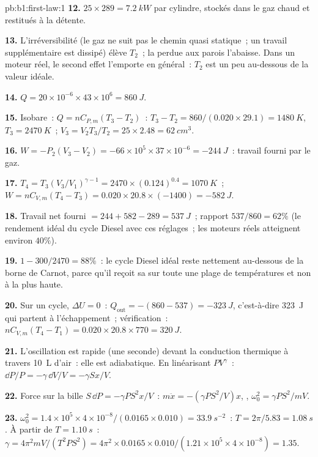 \begin{solution}{pb:b1:first-law:1}
\textbf{12.} $25 \times 289 = \qty{7.2}{kW}$ par cylindre, stockés dans le gaz
chaud et restitués à la détente.

\textbf{13.} L'irréversibilité (le gaz ne suit pas le chemin quasi statique~;
un travail supplémentaire est dissipé) élève $T_2$~; la  perdue aux
parois l'abaisse. Dans un moteur réel, le second effet l'emporte en général~:
$T_2$ est un peu au-dessous de la valeur idéale.

\textbf{14.} $Q = 20\times10^{-6} \times 43\times10^6 = \qty{860}{J}$.

\textbf{15.} Isobare~: $Q = nC_{P,m}(T_3 - T_2)$~: $T_3 - T_2 = 860/(0.020 \times
29.1) = \qty{1480}{K}$, $T_3 = \qty{2470}{K}$~; $V_3 = V_2T_3/T_2 = 25 \times
2.48 = \qty{62}{cm^3}$.

\textbf{16.} $W = -P_2(V_3 - V_2) = -66\times10^5 \times 37\times10^{-6} =
\qty{-244}{J}$~: travail fourni par le gaz.

\textbf{17.} $T_4 = T_3(V_3/V_1)^{\gamma - 1} = 2470 \times (0.124)^{0.4} =
\qty{1070}{K}$~; $W = nC_{V,m}(T_4 - T_3) = 0.020 \times 20.8 \times (-1400) =
\qty{-582}{J}$.

\textbf{18.} Travail net fourni $= 244 + 582 - 289 = \qty{537}{J}$~; rapport
$537/860 = 62\%$ (le rendement idéal du cycle Diesel avec ces réglages~; les
moteurs réels atteignent environ $40\%$).

\textbf{19.} $1 - 300/2470 = 88\%$~: le cycle Diesel idéal reste nettement
au-dessous de la borne de Carnot, parce qu'il reçoit sa  sur toute une
plage de températures et non à la plus haute.

\textbf{20.} Sur un cycle, $\Delta U = 0$~: $Q_{\text{out}} = -(860 - 537) =
\qty{-323}{J}$, c'est-à-dire \qty{323}{J} qui partent à l'échappement~; vérification~:
$nC_{V,m}(T_4 - T_1) = 0.020 \times 20.8 \times 770 = \qty{320}{J}$.

\textbf{21.} L'oscillation est rapide (une seconde) devant la conduction
thermique à travers \qty{10}{L} d'air~: elle est adiabatique. En linéarisant
$PV^\gamma$~: $\dd P/P = -\gamma\,\dd V/V = -\gamma Sx/V$.

\textbf{22.} Force sur la bille $S\,\dd P = -\gamma PS^2x/V$~: $m\ddot x =
-(\gamma PS^2/V)x$, , $\omega_0^2 = \gamma PS^2/mV$.

\textbf{23.} $\omega_0^2 = 1.4 \times 10^5 \times 4\times10^{-8}/(0.0165 \times 0.010)
= \qty{33.9}{s^{-2}}$~: $T = 2\pi/5.83 = \qty{1.08}{s}$. À partir de $T = \qty{1.10}{s}$~:
$\gamma = 4\pi^2mV/(T^2PS^2) = 4\pi^2 \times 0.0165 \times 0.010/(1.21 \times 10^5
\times 4\times10^{-8}) = 1.35$.


\end{solution}
